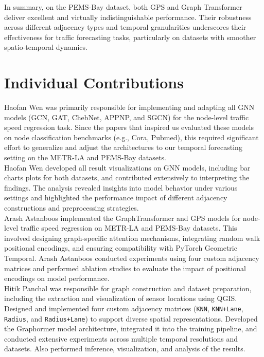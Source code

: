 \documentclass[runningheads]{llncs}
\begin{document}
In summary, on the PEMS-Bay dataset, both GPS and Graph Transformer deliver excellent and virtually indistinguishable performance. Their robustness across different adjacency types and temporal granularities underscores their effectiveness for traffic forecasting tasks, particularly on datasets with smoother spatio-temporal dynamics.


\section{Individual Contributions}
Haofan Wen was primarily responsible for implementing and adapting all GNN models (GCN, GAT, ChebNet, APPNP, and SGCN) for the node-level traffic speed regression task. Since the papers that inspired us evaluated these models on node classification benchmarks (e.g., Cora, Pubmed), this required significant effort to generalize and adjust the architectures to our temporal forecasting setting on the METR-LA and PEMS-Bay datasets.\\
Haofan Wen developed all result visualizations on GNN models, including bar charts plots for both datasets, and contributed extensively to interpreting the findings. The analysis revealed insights into model behavior under various settings and highlighted the performance impact of different adjacency constructions and preprocessing strategies.\\

Arash Astanboos implemented the GraphTransformer and GPS models for node-level traffic speed regression on METR-LA and PEMS-Bay datasets. This involved designing graph-specific attention mechanisms, integrating random walk positional encodings, and ensuring compatibility with PyTorch Geometric Temporal. Arash Astanboos conducted experiments using four custom adjacency matrices and performed ablation studies to evaluate the impact of positional encodings on model performance.\\

Hitik Panchal was responsible for graph construction and dataset preparation, including the extraction and visualization of sensor locations using QGIS. Designed and implemented four custom adjacency matrices (\texttt{KNN}, \texttt{KNN+Lane}, \texttt{Radius}, and \texttt{Radius+Lane}) to support diverse spatial representations. Developed the Graphormer model architecture, integrated it into the training pipeline, and conducted extensive experiments across multiple temporal resolutions and datasets. Also performed inference, visualization, and analysis of the results.



\end{document}

